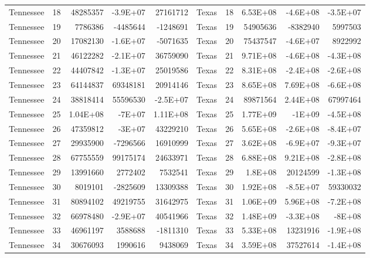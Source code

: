 \begin{table}[]
\begin{tabular}{lrrrrlrrrr}
		Tennessee &  18 & 48285357 & -3.9E+07 & 27161712 & Texas &  18 & 6.53E+08 & -4.6E+08 & -3.5E+07 \\
		Tennessee &  19 & 7786386 & -4485644 & -1248691 & Texas &  19 & 54905636 & -8382940 & 5997503 \\
		Tennessee &  20 & 17082130 & -1.6E+07 & -5071635 & Texas &  20 & 75437547 & -4.6E+07 & 8922992 \\
		Tennessee &  21 & 46122282 & -2.1E+07 & 36759090 & Texas &  21 & 9.71E+08 & -4.6E+08 & -4.3E+08 \\
		Tennessee &  22 & 44407842 & -1.3E+07 & 25019586 & Texas &  22 & 8.31E+08 & -2.4E+08 & -2.6E+08 \\
		Tennessee &  23 & 64144837 & 69348181 & 20914146 & Texas &  23 & 8.65E+08 & 7.69E+08 & -6.6E+08 \\
		Tennessee &  24 & 38818414 & 55596530 & -2.5E+07 & Texas &  24 & 89871564 & 2.44E+08 & 67997464 \\
		Tennessee &  25 & 1.04E+08 & -7E+07 & 1.11E+08 & Texas &  25 & 1.77E+09 & -1E+09 & -4.5E+08 \\
		Tennessee &  26 & 47359812 & -3E+07 & 43229210 & Texas &  26 & 5.65E+08 & -2.6E+08 & -8.4E+07 \\
		Tennessee &  27 & 29935900 & -7296566 & 16910999 & Texas &  27 & 3.62E+08 & -6.9E+07 & -9.3E+07 \\
		Tennessee &  28 & 67755559 & 99175174 & 24633971 & Texas &  28 & 6.88E+08 & 9.21E+08 & -2.8E+08 \\
		Tennessee &  29 & 13991660 & 2772402 & 7532541 & Texas &  29 & 1.8E+08 & 20124599 & -1.3E+08 \\
		Tennessee &  30 & 8019101 & -2825609 & 13309388 & Texas &  30 & 1.92E+08 & -8.5E+07 & 59330032 \\
		Tennessee &  31 & 80894102 & 49219755 & 31642975 & Texas &  31 & 1.06E+09 & 5.96E+08 & -7.2E+08 \\
		Tennessee &  32 & 66978480 & -2.9E+07 & 40541966 & Texas &  32 & 1.48E+09 & -3.3E+08 & -8E+08 \\
		Tennessee &  33 & 46961197 & 3588688 & -1811310 & Texas &  33 & 5.33E+08 & 13231916 & -1.9E+08 \\
		Tennessee &  34 & 30676093 & 1990616 & 9438069 & Texas &  34 & 3.59E+08 & 37527614 & -1.4E+08
	\end{tabular}
\end{table}

